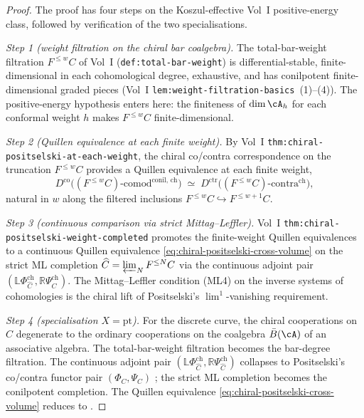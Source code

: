 \begin{proof}
The proof has four steps on the Koszul-effective Vol~I
positive-energy class, followed by verification of the two
specialisations.

\emph{Step 1 \textup(weight filtration on the chiral bar coalgebra\textup).}
The total-bar-weight filtration $F^{\leq w} C$ of Vol~I
\textup(\texttt{def:total-bar-weight}\textup) is differential-stable,
finite-dimensional in each cohomological degree, exhaustive, and has
conilpotent finite-dimensional graded pieces (Vol~I
\texttt{lem:weight-filtration-basics}~\textup{(1)--(4)}). The
positive-energy hypothesis enters here: the finiteness of
$\dim \cA_h$ for each conformal weight $h$ makes
$F^{\leq w} C$ finite-dimensional.

\emph{Step 2 \textup(Quillen equivalence at each finite weight\textup).}
By Vol~I \texttt{thm:chiral-positselski-at-each-weight}, the chiral
co/contra correspondence on the truncation $F^{\leq w} C$ provides
a Quillen equivalence at each finite weight,
\[
D^{\mathrm{co}}\bigl((F^{\leq w} C)\text{-comod}^{\mathrm{conil,\,ch}}\bigr)
\;\simeq\;
D^{\mathrm{ctr}}\bigl((F^{\leq w} C)\text{-contra}^{\mathrm{ch}}\bigr),
\]
natural in $w$ along the filtered inclusions
$F^{\leq w} C \hookrightarrow F^{\leq w+1} C$.

\emph{Step 3 \textup(continuous comparison via strict Mittag--Leffler\textup).}
Vol~I \texttt{thm:chiral-positselski-weight-completed} promotes the
finite-weight Quillen equivalences to a continuous Quillen equivalence
\eqref{eq:chiral-positselski-cross-volume} on the strict ML completion
$\widehat C = \varprojlim_N F^{\leq N} C$ via the continuous adjoint
pair $(\mathbb{L}\Phi^{\mathrm{ch}}_{\widehat C},
\mathbb{R}\Psi^{\mathrm{ch}}_{\widehat C})$. The Mittag--Leffler
condition (ML4) on the inverse systems of cohomologies is the
chiral lift of Positselski's $\lim^1$-vanishing requirement.

\emph{Step 4 \textup(specialisation $X = \mathrm{pt}$\textup).}
For the discrete curve, the chiral cooperations on $C$ degenerate to
the ordinary cooperations on the coalgebra $\bar B(\cA)$ of an
associative algebra. The total-bar-weight filtration becomes the
bar-degree filtration. The continuous adjoint pair
$(\mathbb{L}\Phi^{\mathrm{ch}}_{\widehat C},
\mathbb{R}\Psi^{\mathrm{ch}}_{\widehat C})$ collapses to Positselski's
co/contra functor pair
$(\Phi_C, \Psi_C)$ \cite[\S 6]{Positselski11}; the strict ML completion
becomes the conilpotent completion. The Quillen equivalence
\eqref{eq:chiral-positselski-cross-volume} reduces to
\cite[Théorème~6.10]{Positselski11}.


\end{proof}
